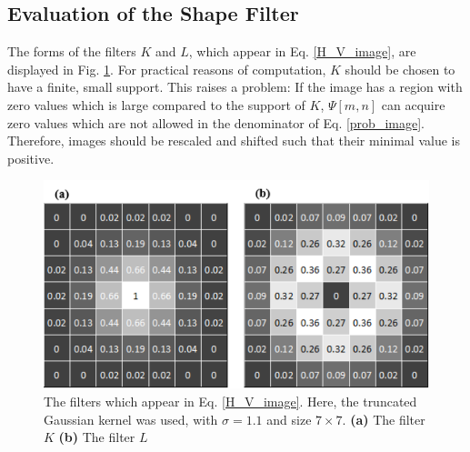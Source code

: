 \documentclass[preprint,12pt]{elsarticle}
\begin{document}
\subsection{Evaluation of the Shape Filter}
\label{filter}
The forms of the filters $K$ and $L$, which appear in Eq. \ref{H_V_image}, are displayed in Fig. \ref{filters}. For practical reasons of computation, $K$ should be chosen to have a finite, small support. This raises a problem: If the image has a region with zero values which is large compared to the support of $K$, $\Psi[m,n]$ can acquire zero values which are not allowed in the denominator of Eq. \ref{prob_image}. Therefore, images should be rescaled and shifted such that their minimal value is positive.


\begin{figure}[t]
\centering
\includegraphics[width=0.6\linewidth]{fig8.pdf}
\caption{The filters which appear in Eq. \ref{H_V_image}. Here, the truncated Gaussian kernel was used, with $\sigma=1.1$ and size $7\times7$.  \textbf{(a)} The filter $K$  \textbf{(b)} The filter $L$}
\label{filters}
\end{figure}
\end{document}
